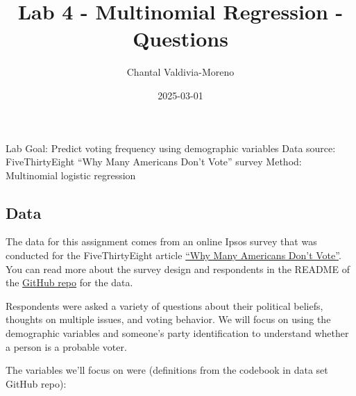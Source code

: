\documentclass[
  letterpaper,
  DIV=11,
  numbers=noendperiod]{scrartcl}
\title{Lab 4 - Multinomial Regression - Questions}
\author{Chantal Valdivia-Moreno}
\date{2025-03-01}
\begin{document}
\maketitle


Lab Goal: Predict voting frequency using demographic variables Data
source: FiveThirtyEight ``Why Many Americans Don't Vote'' survey Method:
Multinomial logistic regression

\subsection{Data}\label{data}

The data for this assignment comes from an online Ipsos survey that was
conducted for the FiveThirtyEight article
\href{https://projects.fivethirtyeight.com/non-voters-poll-2020-election/}{``Why
Many Americans Don't Vote''}. You can read more about the survey design
and respondents in the README of the
\href{https://github.com/fivethirtyeight/data/tree/master/non-voters}{GitHub
repo} for the data.

Respondents were asked a variety of questions about their political
beliefs, thoughts on multiple issues, and voting behavior. We will focus
on using the demographic variables and someone's party identification to
understand whether a person is a probable voter.

The variables we'll focus on were (definitions from the codebook in data
set GitHub repo):
\end{document}
